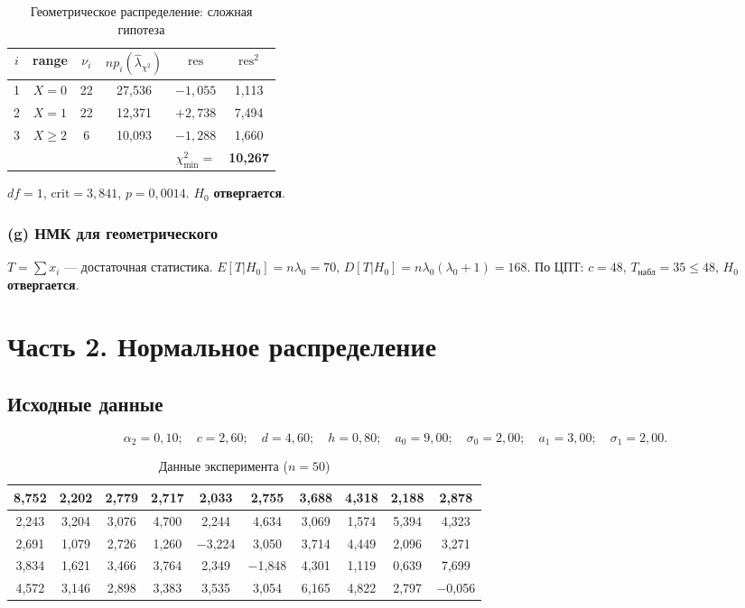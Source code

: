 \documentclass[12pt,a4paper]{article}
\begin{document}
	\begin{table}[H]
		\centering
		\begin{tabular}{cccccc}
			\toprule
			$i$ & range & $\nu_i$ & $np_i(\hat\lambda_{\chi^2})$ & $\mathrm{res}$ & $\mathrm{res}^2$ \\
			\midrule
			1 & $X=0$   & 22 & 27{,}536 & $-1{,}055$ &  1{,}113 \\
			2 & $X=1$   & 22 & 12{,}371 & $+2{,}738$ &  7{,}494 \\
			3 & $X\ge2$ &  6 & 10{,}093 & $-1{,}288$ &  1{,}660 \\
			\bottomrule
			\multicolumn{5}{r}{$\chi^2_{\min} =$} & \textbf{10{,}267} \\
		\end{tabular}
		\caption{Геометрическое распределение: сложная гипотеза}
	\end{table}
	
	$df=1$, $\mathrm{crit}=3{,}841$, $p=0{,}0014$. $H_0$ \textbf{отвергается}.
	
	\subsubsection*{(g) НМК для геометрического}
	
	$T = \sum x_i$ --- достаточная статистика.
	$E[T|H_0]=n\lambda_0=70$, $D[T|H_0]=n\lambda_0(\lambda_0+1)=168$.
	По ЦПТ: $c = 48$, $T_{\text{набл}}=35 \le 48$, $H_0$ \textbf{отвергается}.
	
	\newpage
	\section{Часть 2. Нормальное распределение}
	
	\subsection{Исходные данные}
	
	\[
	\alpha_2 = 0{,}10;\quad c = 2{,}60;\quad d = 4{,}60;\quad h = 0{,}80;\quad
	a_0 = 9{,}00;\quad \sigma_0 = 2{,}00;\quad a_1 = 3{,}00;\quad \sigma_1 = 2{,}00.
	\]
	
	\begin{table}[H]
		\centering
		\small
		\begin{tabular}{|c|c|c|c|c|c|c|c|c|c|}
			\hline
			8{,}752&2{,}202&2{,}779&2{,}717&2{,}033&2{,}755&3{,}688&4{,}318&2{,}188&2{,}878\\
			\hline
			2{,}243&3{,}204&3{,}076&4{,}700&2{,}244&4{,}634&3{,}069&1{,}574&5{,}394&4{,}323\\
			\hline
			2{,}691&1{,}079&2{,}726&1{,}260&$-$3{,}224&3{,}050&3{,}714&4{,}449&2{,}096&3{,}271\\
			\hline
			3{,}834&1{,}621&3{,}466&3{,}764&2{,}349&$-$1{,}848&4{,}301&1{,}119&0{,}639&7{,}699\\
			\hline
			4{,}572&3{,}146&2{,}898&3{,}383&3{,}535&3{,}054&6{,}165&4{,}822&2{,}797&$-$0{,}056\\
			\hline
		\end{tabular}
		\caption{Данные эксперимента ($n=50$)}
	\end{table}
	
\end{document}
